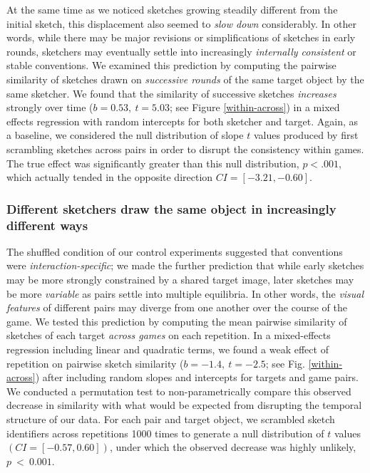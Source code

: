 \documentclass[10pt,letterpaper]{article}
\begin{document}
At the same time as we noticed sketches growing steadily different from the initial sketch, this displacement also seemed to \emph{slow down} considerably.
In other words, while there may be major revisions or simplifications of sketches in early rounds, sketchers may eventually settle into  increasingly \emph{internally consistent} or stable conventions.
We examined this prediction by computing the pairwise similarity of sketches drawn on \emph{successive rounds} of the same target object by the same sketcher.
We found that the similarity of successive sketches \emph{increases} strongly over time ($b = 0.53,~t = 5.03$; see Figure \ref{within-across}) in a mixed effects regression with random intercepts for both sketcher and target.
Again, as a baseline, we considered the null distribution of slope $t$ values produced by first scrambling sketches across pairs in order to disrupt the consistency within games.
The true effect was significantly greater than this null distribution, $p < .001$, which actually tended in the opposite direction $CI = [-3.21, -0.60]$.

\subsubsection{Different sketchers draw the same object in increasingly different ways}

The shuffled condition of our control experiments suggested that conventions were \emph{interaction-specific}; we made the further prediction that while early sketches may be more strongly constrained by a shared target image, later sketches may be more \emph{variable} as pairs settle into multiple equilibria.
In other words, the \emph{visual features} of different pairs may diverge from one another over the course of the game.
We tested this prediction by computing the mean pairwise similarity of sketches of each target \emph{across games} on each repetition.
In a mixed-effects regression including linear and quadratic terms, we found a weak effect of repetition on pairwise sketch similarity ($b = -1.4, ~t = -2.5$; see Fig. \ref{within-across})  after including random slopes and intercepts for targets and game pairs. %
We conducted a permutation test to non-parametrically compare this observed decrease in similarity with what would be expected from disrupting the temporal structure of our data.
For each pair and target object, we scrambled sketch identifiers across repetitions 1000 times to generate a null distribution of $t$ values $(CI = [-0.57, 0.60])$, under which the observed decrease was highly unlikely,~$p~<~0.001$.
\end{document}
